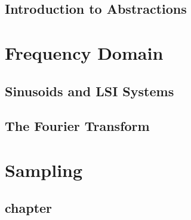 \documentclass{scrbook}
\begin{document}
\chapter{Introduction to Abstractions}


















\part{Frequency Domain}
\chapter{Sinusoids and LSI Systems}





\chapter{The Fourier Transform}






\part{Sampling}
\chapter{chapter}
















\end{document}
